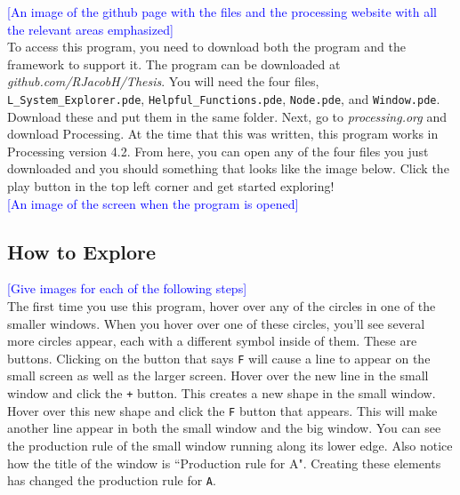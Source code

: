 \documentclass[12pt,twoside]{reedthesis}
\newcommand{\code}[1]{\texttt{#1}}
\begin{document}
	\textcolor{blue}{[An image of the github page with the files and the processing website with all the relevant areas emphasized]}\\
	
	To access this program, you need to download both the program and the framework to support it. The program can be downloaded at \textit{github.com/RJacobH/Thesis}. You will need the four files, \code{L\_System\_Explorer.pde}, \code{Helpful\_Functions.pde}, \code{Node.pde}, and \code{Window.pde}. Download these and put them in the same folder. Next, go to \textit{processing.org} and download Processing. At the time that this was written, this program works in Processing version 4.2. From here, you can open any of the four files you just downloaded and you should something that looks like the image below. Click the play button in the top left corner and get started exploring!\\
	
	\textcolor{blue}{[An image of the screen when the program is opened]}\\
	
\subsection{How to Explore}
	
	
	\textcolor{blue}{[Give images for each of the following steps]}\\
	
	The first time you use this program, hover over any of the circles in one of the smaller windows. When you hover over one of these circles, you'll see several more circles appear, each with a different symbol inside of them. These are buttons. Clicking on the button that says \code{F} will cause a line to appear on the small screen as well as the larger screen. Hover over the new line in the small window and click the \code{+} button. This creates a new shape in the small window. Hover over this new shape and click the \code{F} button that appears. This will make another line appear in both the small window and the big window. You can see the production rule of the small window running along its lower edge. Also notice how the title of the window is ``Production rule for A". Creating these elements has changed the production rule for \code{A}.\\
	
\end{document}
